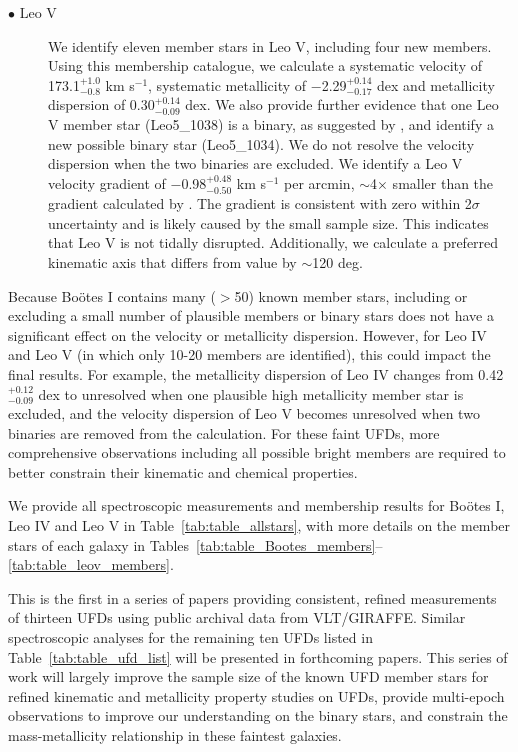 \documentclass[twocolumn]{aastex63}
\newcommand{\revise}[1]{#1}
\begin{document}
\begin{description}
  \item[$\bullet$ Leo V] We identify eleven member stars in Leo V, including four new members. Using this membership catalogue, we calculate a systematic velocity of \revise{173.1$^{+1.0}_{-0.8}$ km s$^{-1}$, systematic metallicity  of $-$2.29$^{+0.14}_{-0.17}$ dex and metallicity dispersion of 0.30$^{+0.14}_{-0.09}$ dex}. We also provide further evidence that one Leo V member star \revise{(Leo5\_1038)} is a binary, as suggested by \citet{mut2020}, and identify a new possible binary star \revise{(Leo5\_1034)}. We do not resolve the velocity dispersion when the two binaries are excluded. We identify a Leo V velocity gradient of $-$0.98$^{+0.48}_{-0.50}$ km s$^{-1}$ per arcmin, $\sim$4$\times$ smaller than the gradient calculated by \citet{col2017}. The gradient is consistent with zero within 2$\sigma$ uncertainty and is likely caused by the small sample size. \revise{This indicates that Leo V is not tidally disrupted.} Additionally, we calculate a preferred kinematic axis that differs from \citet{col2017} value by $\sim$120 deg.
\end{description}

Because Bo{\"o}tes I contains many ($>$50) known member stars, including or excluding a small number of plausible members or binary stars does not have a significant effect on the velocity or metallicity dispersion. However, for Leo IV and Leo V (in which only 10-20 members are identified), this could impact the final results. For example, the metallicity dispersion of Leo IV changes from 0.42$^{+0.12}_{-0.09}$ dex to unresolved when one plausible high metallicity member star is excluded, and the velocity dispersion of Leo V becomes unresolved when two binaries are removed from the calculation. For these faint UFDs, more comprehensive observations including all possible bright members are required to better constrain their kinematic and chemical properties.

We provide all spectroscopic measurements and membership results for Bo{\"o}tes I, Leo IV and Leo V in Table~\ref{tab:table_allstars}, with more details on the member stars of each galaxy in Tables~\ref{tab:table_Bootes_members}--\ref{tab:table_leov_members}. 

\revise{This is the first in a series of papers providing consistent, refined measurements of thirteen UFDs using public archival data from VLT/GIRAFFE.
Similar spectroscopic analyses for the remaining ten UFDs listed in Table~\ref{tab:table_ufd_list} will be presented in forthcoming papers. This series of work will largely improve the sample size of the known UFD member stars for refined kinematic and metallicity property studies on UFDs, provide multi-epoch observations to improve our understanding on the binary stars, and constrain the mass-metallicity relationship in these faintest galaxies.} 
\end{document}
